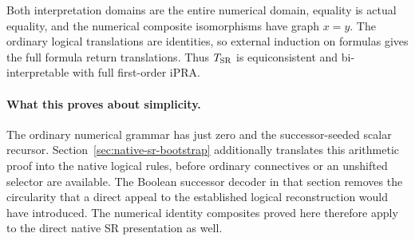 Both interpretation domains are the entire numerical domain, equality
is actual equality, and the numerical composite isomorphisms have graph
$x=y$.  The ordinary logical translations are identities, so external
induction on formulas gives the full formula return translations.
Thus $T_{\rm SR}$ is equiconsistent and bi-interpretable with full
first-order iPRA.

\paragraph{What this proves about simplicity.}
The ordinary numerical grammar has just zero and the successor-seeded
scalar recursor. Section~\ref{sec:native-sr-bootstrap} additionally
translates this arithmetic proof into the native logical rules, before
ordinary connectives or an unshifted selector are available. The Boolean
successor decoder in that section removes the circularity that a direct
appeal to the established logical reconstruction would have introduced.
The numerical identity composites proved here therefore apply to the
direct native SR presentation as well.
